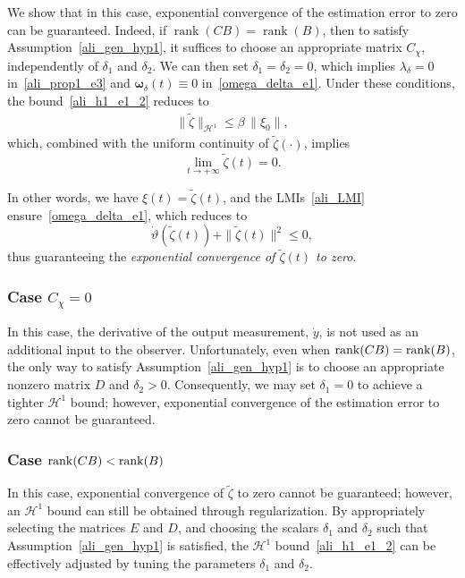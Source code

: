 We show that in this case, exponential convergence of the estimation error to zero can be guaranteed. 
Indeed, if $\operatorname{rank}(CB) = \operatorname{rank}(B)$, then to satisfy Assumption~\ref{ali_gen_hyp1}, it suffices to choose an appropriate matrix $C_{\chi}$, independently of $\delta_1$ and $\delta_2$. 
We can then set $\delta_1 = \delta_2 = 0$, which implies $\lambda_\delta = 0$ in~\eqref{ali_prop1_e3} and $\bm{\omega}_\delta(t) \equiv 0$ in~\eqref{omega_delta_e1}. Under these conditions, the bound~\eqref{ali_h1_e1_2} reduces to
\begin{align}\label{ali_syst3_e6}
\| \tilde{\zeta} \|_{\mathcal{H}^{1}} \le \beta \, \|\xi_0\|,
\end{align}
which, combined with the uniform continuity of $\tilde{\zeta}(\cdot)$, implies
\[
\lim_{t \to +\infty} \tilde{\zeta}(t) = 0.
\]

In other words, we have $\xi(t) = \tilde{\zeta}(t)$, and the LMIs~\eqref{ali_LMI} ensure~\eqref{omega_delta_e1}, which reduces to
\begin{equation*}\label{omega_delta_e1_reduce}
\dot{\vartheta}(\tilde{\zeta}(t)) + \|\tilde{\zeta}(t)\|^2 \le 0,
\end{equation*}
thus guaranteeing the \emph{exponential convergence of $\tilde{\zeta}(t)$ to zero}.





\subsubsection{Case $C_{\chi} = 0$}
%
In this case, the derivative of the output measurement, $\dot{y}$, is not used as an additional input to the observer. Unfortunately, even when $\mathop{{\rm rank}}(CB) = \mathop{{\rm rank}}(B)$, the only way to satisfy Assumption~\ref{ali_gen_hyp1} is to choose an appropriate nonzero matrix $D$ and $\delta_{2} > 0$. Consequently, we may set $\delta_{1} = 0$ to achieve a tighter $\mathcal{H}^{1}$ bound; however, exponential convergence of the estimation error to zero cannot be guaranteed.

\subsubsection{Case $\mathop{{\rm rank}}(CB) < \mathop{{\rm rank}}(B)$}
%
In this case, exponential convergence of $\tilde{\zeta}$ to zero cannot be guaranteed; however, an $\mathcal{H}^{1}$ bound can still be obtained through regularization. By appropriately selecting the matrices $E$ and $D$, and choosing the scalars $\delta_{1}$ and $\delta_{2}$ such that Assumption~\ref{ali_gen_hyp1} is satisfied, the $\mathcal{H}^{1}$ bound~\eqref{ali_h1_e1_2} can be effectively adjusted by tuning the parameters $\delta_{1}$ and $\delta_{2}$.

